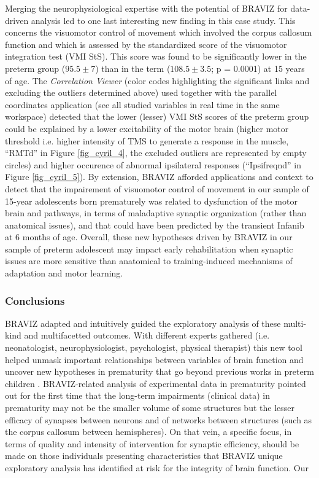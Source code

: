 \documentclass{frontiersHLTH}
\begin{document}
Merging the neurophysiological expertise with the potential of BRAVIZ for data-driven analysis led to  one last interesting new finding in this case study. This concerns the visuomotor control of movement which involved the corpus callosum function \cite{schneider_visuo-motor_2008} and which is assessed by the standardized score of the visuomotor integration test (VMI StS). This score was found to be significantly lower in the preterm group ($95.5\pm7$) than in the term ($108.5\pm3.5$; p = 0.0001) at 15 years of age. The \emph{Correlation Viewer} (color codes highlighting the significant links and excluding the outliers determined above) used together with the parallel coordinates application (see all studied variables in real time in the same workspace) detected  that the lower (lesser) VMI StS scores of the preterm group could be explained by a lower excitability of the motor brain (higher motor threshold i.e. higher intensity of TMS to generate a response in the muscle, “RMTd” in Figure \ref{fig_cyril_4}, the excluded outliers are represented by empty circles) and higher occurence of abnormal ipsilateral responses (“Ipsifreqnd” in Figure \ref{fig_cyril_5}). By extension, BRAVIZ afforded applications and context to detect that the impairement of visuomotor control of movement in our sample of 15-year adolescents born prematurely was related to dysfunction of the motor brain and pathways, in terms of maladaptive synaptic organization (rather than anatomical issues), and that could have been predicted by the transient Infanib at 6 months of age. Overall, these new hypotheses driven by BRAVIZ in our sample of preterm adolescent may impact early rehabilitation when synaptic issues are more sensitive than anatomical to training-induced mechanisms of adaptation and motor learning.

\subsubsection{Conclusions}

BRAVIZ adapted and intuitively guided the exploratory analysis of these multi-kind and multifacetted outcomes. With different experts gathered (i.e. neonatologist, neurophysiologist, psychologist, physical therapist) this new tool helped unmask important relationships between variables of brain function and uncover new hypotheses in prematurity that go beyond previous works in preterm children \cite{schneider_cerebral_2012, schneider_visuo-motor_2008, flamand_brain_2012}. BRAVIZ-related analysis of experimental data in prematurity pointed out for the first time that the long-term impairments (clinical data) in prematurity may not be the smaller volume of some structures but the lesser efficacy of synapses between neurons and of networks between structures (such as the corpus callosum between hemispheres). On that vein, a specific focus, in terms of quality and intensity of intervention for synaptic efficiency, should be made on those individuals presenting characteristics that BRAVIZ unique exploratory analysis has identified at risk for the integrity of brain function.
Our
  
\end{document}
